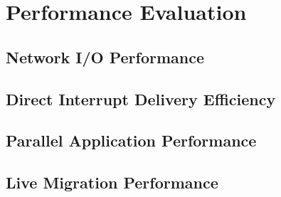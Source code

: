 \section{Performance Evaluation}
\vspace{-0.05in}



\vspace{-0.1in}
\subsection{Network I/O Performance}
\vspace{-0.05in}


\vspace{-0.1in}
\subsection{Direct Interrupt Delivery Efficiency}
\vspace{-0.05in}


\vspace{-0.1in}
\subsection{Parallel Application Performance}
\vspace{-0.05in}


\vspace{-0.1in}
\subsection{Live Migration Performance}
\vspace{-0.05in}



